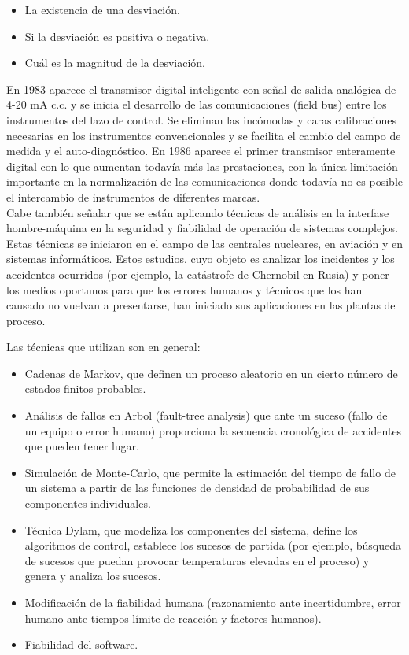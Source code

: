 \documentclass[12pt,letterpaper, onecolumn, titlepage, oneside]{book}
\begin{document}
\begin{itemize}
    \item La existencia de una desviación. 
    \item Si la desviación es positiva o negativa.
    \item Cuál es la magnitud de la desviación. 
\end{itemize}

En 1983 aparece el transmisor digital inteligente con señal de salida analógica de 4-20 mA c.c. y se inicia el desarrollo de las comunicaciones (field bus) entre los instrumentos del lazo de control. Se eliminan las incómodas y caras calibraciones necesarias en los instrumentos convencionales y se facilita
el cambio del campo de medida y el auto-diagnóstico. En 1986 aparece el primer transmisor enteramente digital con lo que aumentan todavía más las prestaciones, con la única limitación importante en la normalización de las comunicaciones donde todavía no es posible el intercambio de instrumentos de diferentes marcas.\\

Cabe también señalar que se están aplicando técnicas de análisis en la interfase hombre-máquina en la seguridad y fiabilidad de operación de sistemas complejos. Estas técnicas se iniciaron en el campo de las centrales nucleares, en aviación y en sistemas informáticos. Estos estudios, cuyo objeto es analizar los incidentes y los accidentes ocurridos (por ejemplo, la catástrofe de Chernobil en Rusia) y poner los medios oportunos para que los errores humanos y técnicos que los han causado no vuelvan a presentarse, han iniciado sus aplicaciones en las plantas de proceso. 

Las técnicas que utilizan son en general: 
\begin{itemize}
    \item Cadenas de Markov, que definen un proceso aleatorio en un cierto número de estados finitos probables. 
    \item Análisis de fallos en Arbol (fault-tree analysis) que ante un suceso (fallo de un equipo o error humano) proporciona la secuencia cronológica de accidentes que pueden tener lugar. 
    \item  Simulación de Monte-Carlo, que permite la estimación del tiempo de fallo de un sistema a partir de las funciones de densidad de probabilidad de sus componentes individuales. 
    \item Técnica Dylam, que modeliza los componentes del sistema, define los algoritmos de control, establece los sucesos de partida (por ejemplo, búsqueda de sucesos que puedan provocar temperaturas elevadas en el proceso) y genera y analiza los sucesos. 
    \item Modificación de la fiabilidad humana (razonamiento ante incertidumbre, error humano ante tiempos límite de reacción y factores humanos). 
    \item Fiabilidad del software.
\end{itemize}
\end{document}
